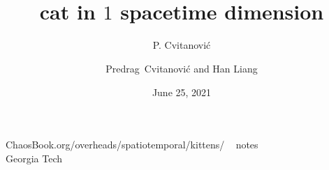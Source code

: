 


                        \newif\ifboyscout\boyscouttrue          %
                        \newif\ifsubmission\submissionfalse     %
                        \newif\ifblog\blogfalse %


\usepackage[font=scriptsize, labelfont=bf]{caption}
\usepackage[
    backend=biber,  %
    sorting=nyt,
    style=numeric, %
    natbib=true,
    style=phys, %
    biblabel= brackets, %
    articletitle=false, %
    pageranges = true , %
    sortlocale=en_US,
    firstinits=true,
    url=false, %
    doi=false, %
    eprint=false
]{biblatex}



\renewcommand{\Ssym}[1]{{\ensuremath{m_{#1}}}}    %


\title{
{\huge \HillDet} %
    \\
{cat in $1$ spacetime dimension}
}
\author{P. Cvitanovi\'c}
\author[Cvitanovi\'c]
{
  \textcolor{green!50!black}{
  {Predrag~Cvitanovi\'c
   and
   Han Liang
  }	%
  }
}
\institute
{
 ChaosBook.org/overheads/spatiotemporal/kittens/   ~ notes
 \\
               Georgia Tech
 }
\date{June 25, 2021}


